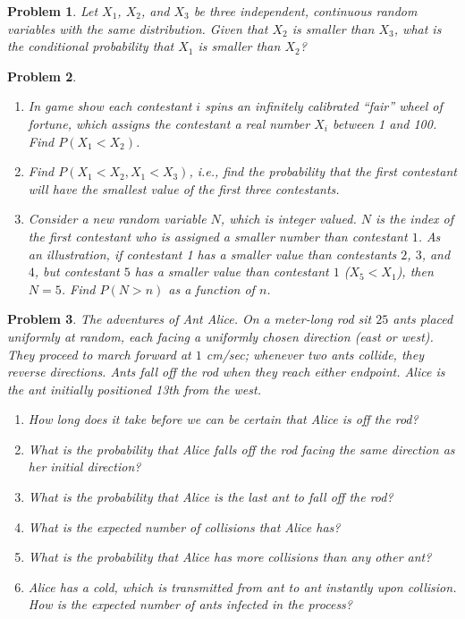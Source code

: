 \documentclass[12pt]{article}
\newtheorem{problem}{Problem}
\begin{document}
\begin{problem}
Let $X_1$, $X_2$, and $X_3$ be three independent, continuous random variables with the same distribution. Given that $X_2$ is smaller than $X_3$, what is the conditional probability that $X_1$ is smaller than $X_2$?
\end{problem}

\begin{problem}
    \begin{enumerate}
        \item In game show each contestant $i$ spins an infinitely calibrated ``fair'' wheel of fortune, which assigns the contestant a real number $X_i$ between 1 and 100. Find $P(X_1 < X_2)$.
        \item Find $P(X_1 < X_2, X_1 < X_3)$, i.e., find the probability that the first contestant will have the smallest value of the first three contestants.
        \item Consider a new random variable $N$, which is integer valued. $N$ is the index of the first contestant who is assigned a smaller number than contestant $1$. As an illustration, if contestant 1 has a smaller value than contestants $2$, $3$, and $4$, but contestant $5$ has a smaller value than contestant $1$ ($X_5 < X_1$), then $N = 5$. Find $P(N > n)$ as a function of $n$.
    \end{enumerate}
\end{problem}

\begin{problem}
The adventures of Ant Alice. On a meter-long rod sit $25$ ants placed uniformly at random, each facing a uniformly chosen direction (east or west). They proceed to march forward at $1$ cm/sec; whenever two ants collide, they reverse directions. Ants fall off the rod when they reach either endpoint. Alice is the ant initially positioned 13th from the west.
    \begin{enumerate}
        \item How long does it take before we can be certain that Alice is off the rod?
        \item What is the probability that Alice falls off the rod facing the same direction as her initial direction?
        \item What is the probability that Alice is the last ant to fall off the rod?
        \item What is the expected number of collisions that Alice has?
        \item What is the probability that Alice has more collisions than any other ant?
        \item Alice has a cold, which is transmitted from ant to ant instantly upon collision. How is the expected number of ants infected in the process?
    \end{enumerate}
\end{problem}
\end{document}
